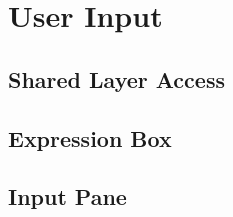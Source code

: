 \documentclass[../../../../main.tex]{subfiles}
\begin{document}
\section{User Input}

\subsection{Shared Layer Access}

\newpage
\subsection{Expression Box}


\newpage
\subsection{Input Pane}


\newpage
\end{document}
